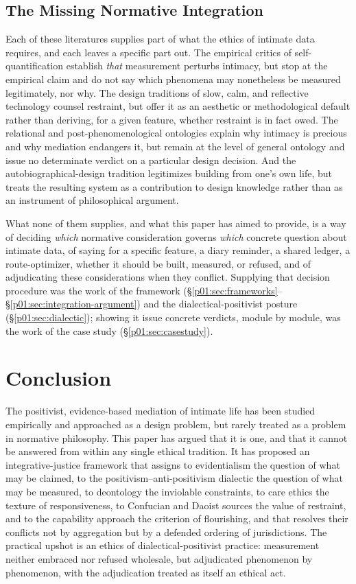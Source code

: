 \documentclass[11pt,a4paper]{article}
\begin{document}
\subsection{The Missing Normative Integration}

Each of these literatures supplies part of what the ethics of intimate data requires, and each leaves a specific part out. The empirical critics of self-quantification establish \emph{that} measurement perturbs intimacy, but stop at the empirical claim and do not say which phenomena may nonetheless be measured legitimately, nor why. The design traditions of slow, calm, and reflective technology counsel restraint, but offer it as an aesthetic or methodological default rather than deriving, for a given feature, whether restraint is in fact owed. The relational and post-phenomenological ontologies explain why intimacy is precious and why mediation endangers it, but remain at the level of general ontology and issue no determinate verdict on a particular design decision. And the autobiographical-design tradition legitimizes building from one's own life, but treats the resulting system as a contribution to design knowledge rather than as an instrument of philosophical argument.

What none of them supplies, and what this paper has aimed to provide, is a way of deciding \emph{which} normative consideration governs \emph{which} concrete question about intimate data, of saying for a specific feature, a diary reminder, a shared ledger, a route-optimizer, whether it should be built, measured, or refused, and of adjudicating these considerations when they conflict. Supplying that decision procedure was the work of the framework (§\ref{p01:sec:frameworks}--§\ref{p01:sec:integration-argument}) and the dialectical-positivist posture (§\ref{p01:sec:dialectic}); showing it issue concrete verdicts, module by module, was the work of the case study (§\ref{p01:sec:casestudy}).

\section{Conclusion}\label{p01:sec:conclusion}

The positivist, evidence-based mediation of intimate life has been studied empirically and approached as a design problem, but rarely treated as a problem in normative philosophy. This paper has argued that it is one, and that it cannot be answered from within any single ethical tradition. It has proposed an integrative-justice framework that assigns to evidentialism the question of what may be claimed, to the positivism--anti-positivism dialectic the question of what may be measured, to deontology the inviolable constraints, to care ethics the texture of responsiveness, to Confucian and Daoist sources the value of restraint, and to the capability approach the criterion of flourishing, and that resolves their conflicts not by aggregation but by a defended ordering of jurisdictions. The practical upshot is an ethics of dialectical-positivist practice: measurement neither embraced nor refused wholesale, but adjudicated phenomenon by phenomenon, with the adjudication treated as itself an ethical act.
\end{document}
